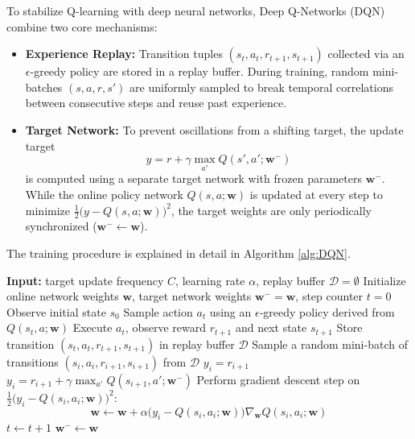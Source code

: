 \documentclass[10pt, a4paper]{report}
\begin{document}
To stabilize Q-learning with deep neural networks, Deep Q-Networks (DQN) combine two core mechanisms:
\begin{itemize}
    \item \textbf{Experience Replay:} Transition tuples $(s_t, a_t, r_{t+1}, s_{t+1})$ collected via an $\epsilon$-greedy policy are stored in a replay buffer. During training, random mini-batches $(s, a, r, s')$ are uniformly sampled to break temporal correlations between consecutive steps and reuse past experience.
    \item \textbf{Target Network:} To prevent oscillations from a shifting target, the update target \[y = r + \gamma \max_{a'} Q(s', a'; \mathbf w^-)\] is computed using a separate target network with frozen parameters $\mathbf w^-$. While the online policy network $Q(s, a;\mathbf  w)$ is updated at every step to minimize $\frac{1}{2}\big(y - Q(s, a;\mathbf w)\big)^2$, the target weights are only periodically synchronized ($\mathbf w^- \leftarrow \mathbf w$).
\end{itemize}

The training procedure is explained in detail in Algorithm \ref{alg:DQN}.

\begin{algorithm}[H]
\caption{Deep Q-Network (DQN)}\label{alg:DQN}
\begin{algorithmic}[1]
    \State \textbf{Input:} target update frequency $C$, learning rate $\alpha$, replay buffer $\mathcal{D} = \emptyset$
    \State Initialize online network weights $\mathbf{w}$, target network weights $\mathbf{w}^- = \mathbf{w}$, step counter $t = 0$
    \State Observe initial state $s_0$
    \Loop
        \State Sample action $a_t$ using an $\epsilon$-greedy policy derived from $Q(s_t, a; \mathbf{w})$
        \State Execute $a_t$, observe reward $r_{t+1}$ and next state $s_{t+1}$
        \State Store transition $(s_t, a_t, r_{t+1}, s_{t+1})$ in replay buffer $\mathcal{D}$
        \State Sample a random mini-batch of transitions $(s_i, a_i, r_{i+1}, s_{i+1})$ from $\mathcal{D}$
                \State $y_i = r_{i+1}$
            \Else
                \State $y_i = r_{i+1} + \gamma \max_{a'} Q(s_{i+1}, a'; \mathbf{w}^-)$
            \EndIf
            \State Perform gradient descent step on $\frac{1}{2}\big(y_i - Q(s_i, a_i; \mathbf{w})\big)^2$:
            \[
                \mathbf{w} \leftarrow \mathbf{w} + \alpha \big(y_i - Q(s_i, a_i; \mathbf{w})\big) \nabla_{\mathbf{w}} Q(s_i, a_i; \mathbf{w})
            \]
        \EndFor
        \State $t \leftarrow t + 1$
            \State $\mathbf{w}^- \leftarrow \mathbf{w}$
        \EndIf
    \EndLoop
\end{algorithmic}
\end{algorithm}
\end{document}
